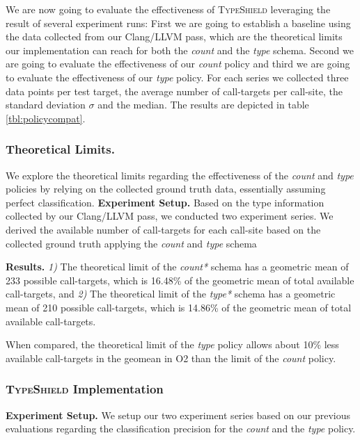 We are now going to evaluate the effectiveness of \textsc{TypeShield} leveraging the result of several experiment runs: First we are going to establish a baseline using the data 
collected from our Clang/LLVM pass, which are the theoretical limits our implementation can reach for both the \textit{count} and the \textit{type} schema. Second we are going to evaluate the effectiveness of our \textit{count} 
policy and third we are going to evaluate the effectiveness of our \textit{type} policy. For each series we collected three data points per test target, the average number of call-targets per call-site, the standard deviation $\sigma$ and the median. The results are depicted in table \ref{tbl:policycompat}. 

\subsubsection{Theoretical Limits.}
\label{subsection:theoreticallimit}
We explore the theoretical limits regarding the effectiveness of the \textit{count} and \textit{type} policies by relying on the collected ground truth data, essentially assuming perfect classification.
\textbf{Experiment Setup.} Based on the type information collected by our Clang/LLVM pass, we conducted two experiment series.
We derived the available number of call-targets for each call-site based on the collected ground truth applying the \textit{count} and \textit{type} schema

\textbf{Results.}
\textit{1)} The theoretical limit of the \textit{count*} schema has a geometric mean of 233 possible call-targets, which is 16.48\% of the geometric mean of total available 
call-targets, and
\textit{2)} The theoretical limit of the \textit{type*} schema has a geometric mean of 210 possible call-targets, which is 14.86\% of the geometric mean of total available
call-targets.

When compared, the theoretical limit of the \textit{type} policy allows about 10\% less available call-targets in the geomean in O2 than the limit of the \textit{count} policy.

\subsubsection{\textsc{TypeShield} Implementation}
\label{subsection:typeshieldvslimitcount}
\textbf{Experiment Setup.} We setup our two experiment series based on our previous evaluations regarding the classification precision for the \textit{count} and the \textit{type} policy.

